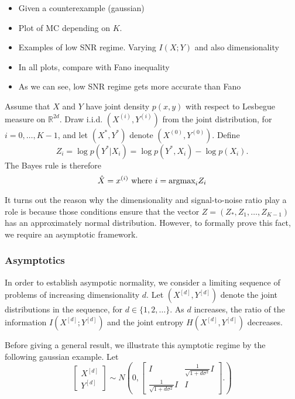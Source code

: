 \documentclass[12pt]{article}
\begin{document}
\begin{itemize}
\item Given a counterexample (gaussian)
\item Plot of $\text{MC}$ depending on $K$.
\item Examples of low SNR regime.  Varying $I(X;Y)$ and also dimensionality 
\item In all plots, compare with Fano inequality
\item As we can see, low SNR regime gets more accurate than Fano
\end{itemize}

Assume that $X$ and $Y$ have joint density $p(x, y)$ with respect to
Lesbegue measure on $\mathbb{R}^{2d}$.  Draw i.i.d. $(X^{(i)},
Y^{(i)})$ from the joint distribution, for $i = 0,\hdots, K-1$, and let
$(X^*, Y^*)$ denote $(X^{(0)}, Y^{(0)})$.  Define
\[
Z_i = \log p(Y^*|X_i) = \log p(Y^*, X_i) - \log p(X_i).
\]
The Bayes rule is therefore
\[
\hat{X} = x^{(i)} \text{ where }i = \text{argmax}_i Z_i
\]

It turns out the reason why the dimensionality and signal-to-noise
ratio play a role is because those conditions ensure that the vector
$Z = (Z_*, Z_1,\hdots, Z_{K-1})$ has an approximately normal
distribution.  However, to formally prove this fact, we require an
asymptotic framework.

\subsubsection{Asymptotics}

In order to establish asympotic normality, we consider a limiting
sequence of problems of increasing dimensionality $d$.  Let $(X^{[d]},
Y^{[d]})$ denote the joint distributions in the sequence, for
$d \in \{1, 2, \hdots\}.$ As $d$ increases, the ratio of the
information $I(X^{[d]}; Y^{[d]})$ and the joint entropy $H(X^{[d]},
Y^{[d]})$ decreases.

Before giving a general result, we illustrate this aymptotic regime by
the following gaussian example.  Let
\[
\begin{bmatrix}
X^{[d]}\\Y^{[d]}
\end{bmatrix} \sim 
N\left(
0, \begin{bmatrix}
I & \frac{1}{\sqrt{1 + d\sigma^2}}I \\
\frac{1}{\sqrt{1 + d\sigma^2}} I & I
\end{bmatrix}.
\right)
\]
\end{document}
